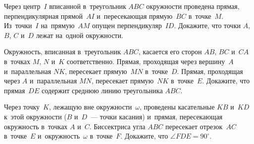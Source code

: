 \begin{problems}
\item
Через центр~$I$ вписанной в~треугольник $ABC$ окружности проведена прямая,
перпендикулярная прямой~$AI$ и~пересекающая прямую~$BC$ в~точке~$M$.
Из~точки~$I$ на~прямую~$AM$ опущен перпендикуляр~$ID$.
Докажите, что точки $A$, $B$, $C$ и~$D$ лежат на~одной окружности.

\item
Окружность, вписанная в~треугольник $ABC$, касается его сторон
$AB$, $BC$ и~$CA$ в~точках $M$, $N$ и~$K$ соответственно.
Прямая, проходящая через вершину~$A$ и~параллельная $NK$, пересекает
прямую~$MN$ в~точке~$D$.
Прямая, проходящая через $A$ и~параллельная $MN$,
пересекает прямую~$NK$ в~точке~$E$.
Докажите, что прямая~$DE$ содержит среднюю линию треугольника $ABC$.

\item
Через точку~$K$, лежащую вне окружности~$\omega$, проведены касательные $KB$
и~$KD$ к~этой окружности ($B$ и~$D$~--- точки касания) и~прямая, пересекающая
окружность в~точках $A$ и~$C$.
Биссектриса угла $ABC$ пересекает отрезок~$AC$ в~точке~$E$
и~окружность~$\omega$ в~точке~$F$.
Докажите, что $\angle FDE = 90^{\circ}$.

\end{problems}

